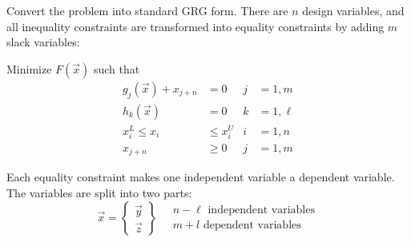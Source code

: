 \documentclass{article}
\begin{document}
\begin{enumerate*}
\item Convert the problem into standard GRG form. There are \(n\)
  design variables, and all inequality constraints are transformed into equality
  constraints by adding \(m\) slack variables:

  Minimize \(F(\vec{x})\) such that
  \begin{align*}
    g_j(\vec{x}) + x_{j+n} &= 0 & j &= 1,m \\
    h_k(\vec{x}) &= 0 & k &= 1,\ell \\
    x_i^L \le x_i &\le x_i^U & i &= 1,n \\
    x_{j+n} &\ge 0 & j &= 1,m
  \end{align*}

  Each equality constraint makes one independent variable a dependent variable. The variables are split into two parts:
  \[\vec{x} = \begin{Bmatrix}\vec{y} \\ \vec{z}\end{Bmatrix} \quad
  \begin{array}{l} n-\ell \text{ independent variables} \\ m + l \text{ dependent variables} \end{array}\]


\end{enumerate*}
\end{document}
